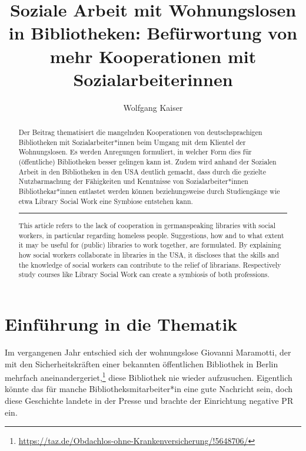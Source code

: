 \documentclass[a4paper,
fontsize=11pt,
oneside,
numbers=noperiodatend,
parskip=half-,
bibliography=totoc,
final
]{scrartcl}
\title{\LARGE{Soziale Arbeit mit Wohnungslosen in Bibliotheken: Befürwortung von mehr Kooperationen mit Sozialarbeiter\*innen}}%
\author{Wolfgang Kaiser} %
\date{}
\begin{document}
\sloppy

\maketitle
\thispagestyle{fancyplain} 

\begin{abstract}
\noindent
Der Beitrag thematisiert die mangelnden Kooperationen von
deutschsprachigen Bibliotheken mit Sozialarbeiter*innen beim Umgang mit
dem Klientel der Wohnungslosen. Es werden Anregungen formuliert, in
welcher Form dies für (öffentliche) Bibliotheken besser gelingen kann
ist. Zudem wird anhand der Sozialen Arbeit in den Bibliotheken in den
USA deutlich gemacht, dass durch die gezielte Nutzbarmachung der
Fähigkeiten und Kenntnisse von Sozialarbeiter*innen Bibliothekar*innen
entlastet werden können beziehungsweise durch Studiengänge wie etwa
Library Social Work eine Symbiose entstehen kann.

\begin{center}\rule{0.5\linewidth}{0.5pt}\end{center}
\noindent
This article refers to the lack of cooperation in germanspeaking
libraries with social workers, in particular regarding homeless people.
Suggestions, how and to what extent it may be useful for (public)
libraries to work together, are formulated. By explaining how social
workers collaborate in libraries in the USA, it discloses that the
skills and the knowledge of social workers can contribute to the relief
of librarians. Respectively study courses like Library Social Work can
create a symbiosis of both professions.
\end{abstract}

\hypertarget{einfuxfchrung-in-die-thematik}{%
\section{Einführung in die
Thematik}\label{einfuxfchrung-in-die-thematik}}

Im vergangenen Jahr entschied sich der wohnungslose Giovanni Maramotti,
der mit den Sicherheitskräften einer bekannten öffentlichen Bibliothek
in Berlin mehrfach aneinandergeriet,\footnote{\url{https://taz.de/Obdachlos-ohne-Krankenversicherung/!5648706/}}
diese Bibliothek nie wieder aufzusuchen. Eigentlich könnte das für
manche Bibliotheksmitarbeiter*in eine gute Nachricht sein, doch diese
Geschichte landete in der Presse und brachte der Einrichtung negative PR
ein.
\end{document}

